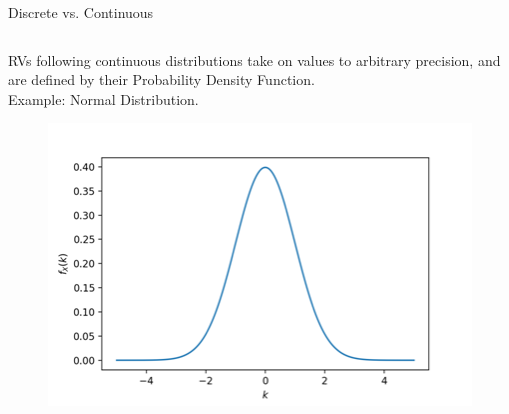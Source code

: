 \documentclass[aspectratio=169]{../latex_main/tntbeamer}  %
\begin{document}
\begin{frame}{Discrete vs. Continuous}
\begin{columns}
\begin{column}{.4\textwidth}
	               RVs following continuous distributions take on values to arbitrary precision, and are defined by their Probability Density Function.\\
	               Example: Normal Distribution.\\
	               \bigskip
                    \begin{figure}
                        \includegraphics[scale=.5]{Bild5}
                    \end{figure}
	        \end{column}
	    \end{columns}
	\end{frame}
	
\end{document}
